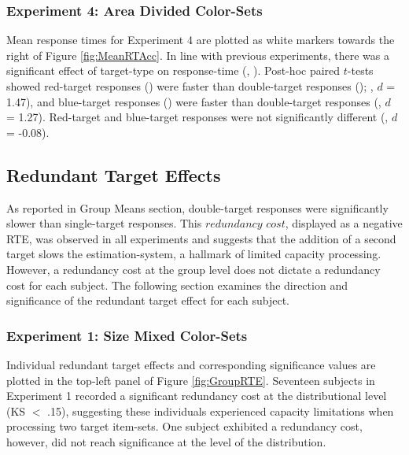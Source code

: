 \subsubsection{Experiment 4: Area Divided Color-Sets}
Mean response times for Experiment 4 are plotted as white markers towards the right of Figure \ref{fig:MeanRTAcc}. In line with previous experiments, there was a significant effect of target-type on response-time (, ). Post-hoc paired $t$-tests showed red-target responses () were faster than double-target responses (); , $d$ = 1.47), and blue-target responses () were faster than double-target responses (, $d$ = 1.27). Red-target and blue-target responses were not significantly different (, $d$ = -0.08).

\subsection{Redundant Target Effects}
As reported in Group Means section, double-target responses were significantly slower than single-target responses. This $redundancy$ $cost$, displayed as a negative RTE, was observed in all experiments and suggests that the addition of a second target slows the estimation-system, a hallmark of limited capacity processing. However, a redundancy cost at the group level does not dictate a redundancy cost for each subject. The following section examines the direction and significance of the redundant target effect for each subject.

\subsubsection{Experiment 1: Size Mixed Color-Sets}
Individual redundant target effects and corresponding significance values are plotted in the top-left panel of Figure \ref{fig:GroupRTE}. Seventeen subjects in Experiment 1 recorded a significant redundancy cost at the distributional level (KS $<$ .15), suggesting these individuals experienced capacity limitations when processing two target item-sets. One subject exhibited a redundancy cost, however, did not reach significance at the level of the distribution.

